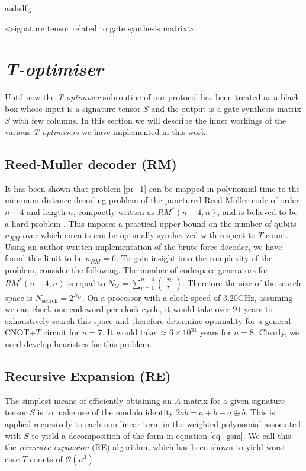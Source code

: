 \documentclass[titlepage]{article}
\theoremstyle{definition}
\theoremstyle{problem}
\theoremstyle{lemma}
\begin{document}
asdsdfg

<signature tensor related to gate synthesis matrix> \fi

\section{\emph{T-optimiser}}
Until now the \emph{T-optimiser} subroutine of our protocol has been treated as a black box whose input is a signature tensor $S$ and the output is a gate synthesis matrix $S$ with few columns. In this section we will describe the inner workings of the various \emph{T-optimiser}s we have implemented in this work.

\subsection{Reed-Muller decoder (RM)}
It has been shown that problem \ref{pr_1} can be mapped in polynomial time to the minimum distance decoding problem of the punctured Reed-Muller code of order $n-4$ and length $n$, compactly written as $RM^*(n-4, n)$, and is believed to be a hard problem \cite{3_Amy_2016}. This imposes a practical upper bound on the number of qubits $n_{RM}$ over which circuits can be optimally synthesized with respect to $T$ count. Using an author-written implementation of the brute force decoder, we have found this limit to be $n_{RM} = 6$. To gain insight into the complexity of the problem, consider the following. The number of codespace generators for $RM^*(n-4, n)$ is equal to $N_G = \sum_{r=1}^{n-4}\begin{pmatrix}
n \\ r \end{pmatrix}$. Therefore the size of the search space is $N_{\text{search}} = 2^{N_G}$. On a processor with a clock speed of 3.20GHz, assuming we can check one codeword per clock cycle, it would take over $91$ years to exhaustively search this space and therefore determine optimality for a general CNOT+$T$ circuit for $n=7$. It would take $\approx 6\times10^{31}$ years for $n=8$. Clearly, we need develop heuristics for this problem.

\subsection{Recursive Expansion (RE)}
The simplest means of efficiently obtaining an $A$ matrix for a given signature tensor $S$ is to make use of the modulo identity $2ab = a + b - a\oplus b$. This is applied recursively to each non-linear term in the weighted polynomial associated with $S$ to yield a decomposition of the form in equation \ref{eq_gsm}. We call this the \emph{recursive expansion} (RE) algorithm, which has been shown to yield worst-case $T$ counts of $\mathcal{O}(n^3)$.
\end{document}
